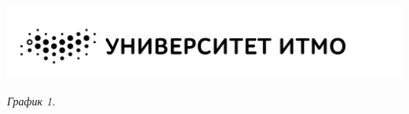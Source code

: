 \hypertarget{diagram1}{}

\begin{center}
    \includegraphics[width=15cm]{images/logo}

    \smallvspace

    \textit{График 1.} 
\end{center}
